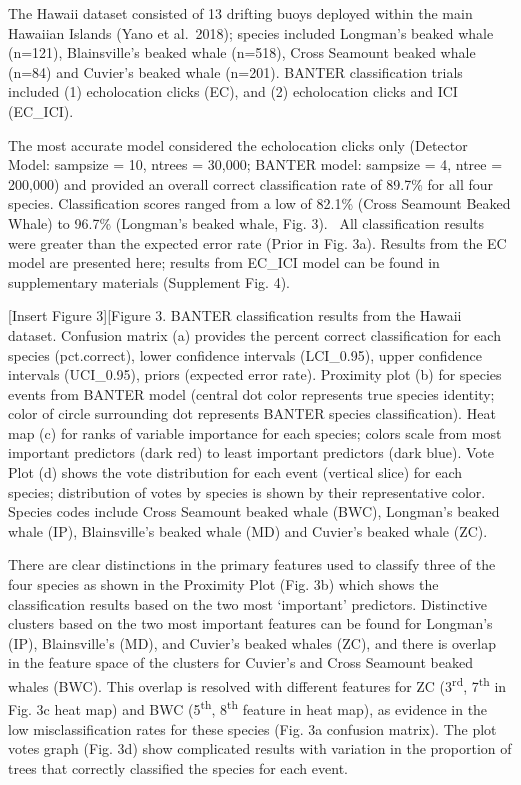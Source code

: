 \documentclass[
  authoryear,
  preprint,
  3p]{elsarticle}
\begin{document}
The Hawaii dataset consisted of 13 drifting buoys deployed within the
main Hawaiian Islands (Yano et al.~2018); species included Longman's
beaked whale (n=121), Blainsville's beaked whale (n=518), Cross Seamount
beaked whale (n=84) and Cuvier's beaked whale (n=201). BANTER
classification trials included (1) echolocation clicks (EC), and (2)
echolocation clicks and ICI (EC\_ICI).

The most accurate model considered the echolocation clicks only
(Detector Model: sampsize = 10, ntrees = 30,000; BANTER model: sampsize
= 4, ntree = 200,000) and provided an overall correct classification
rate of 89.7\% for all four species. Classification scores ranged from a
low of 82.1\% (Cross Seamount Beaked Whale) to 96.7\% (Longman's beaked
whale, Fig. 3). ~All classification results were greater than the
expected error rate (Prior in Fig. 3a). Results from the EC model are
presented here; results from EC\_ICI model can be found in supplementary
materials (Supplement Fig. 4).

{[}Insert Figure 3{]}{[}Figure 3. BANTER classification results from the
Hawaii dataset. Confusion matrix (a) provides the percent correct
classification for each species (pct.correct), lower confidence
intervals (LCI\_0.95), upper confidence intervals (UCI\_0.95), priors
(expected error rate). Proximity plot (b) for species events from BANTER
model (central dot color represents true species identity; color of
circle surrounding dot represents BANTER species classification). Heat
map (c) for ranks of variable importance for each species; colors scale
from most important predictors (dark red) to least important predictors
(dark blue). Vote Plot (d) shows the vote distribution for each event
(vertical slice) for each species; distribution of votes by species is
shown by their representative color. Species codes include Cross
Seamount beaked whale (BWC), Longman's beaked whale (IP), Blainsville's
beaked whale (MD) and Cuvier's beaked whale (ZC).

There are clear distinctions in the primary features used to classify
three of the four species as shown in the Proximity Plot (Fig. 3b) which
shows the classification results based on the two most `important'
predictors. Distinctive clusters based on the two most important
features can be found for Longman's (IP), Blainsville's (MD), and
Cuvier's beaked whales (ZC), and there is overlap in the feature space
of the clusters for Cuvier's and Cross Seamount beaked whales (BWC).
This overlap is resolved with different features for ZC
(3\textsuperscript{rd}, 7\textsuperscript{th} in Fig. 3c heat map) and
BWC (5\textsuperscript{th}, 8\textsuperscript{th} feature in heat map),
as evidence in the low misclassification rates for these species (Fig.
3a confusion matrix). The plot votes graph (Fig. 3d) show complicated
results with variation in the proportion of trees that correctly
classified the species for each event.
\end{document}
